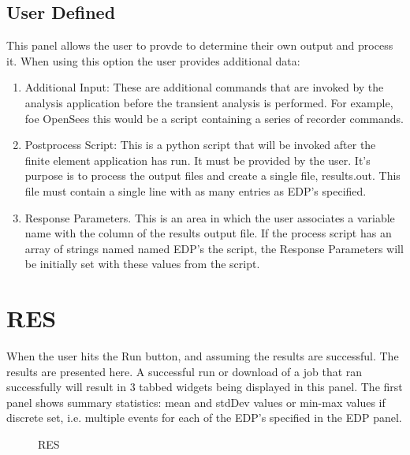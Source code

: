 \subsection{User Defined}
This panel allows the user to provde to determine their own output and process it. When using this option the user provides additional data:
\begin{enumerate}
\item Additional Input: These are additional commands that are invoked by the analysis application before the transient analysis is performed. For example, foe OpenSees this would be a script containing a series of recorder commands.
\item Postprocess Script: This is a python script that will be invoked after the finite element application has run. It must be provided by the user. It's purpose is to process the output files and create a single file, results.out. This file must contain a single line with as many entries as EDP's specified.

\item Response Parameters. This is an area in which the user associates a variable name with the column of the results output file. If the process script has an array of strings named named EDP's the script, the Response Parameters will be initially set with these values from the script.
\end{enumerate}


\section{RES}

When the user hits the Run button, and assuming the results are successful. The results are presented here.  A successful run or download of a job that ran successfully will result in 3 tabbed widgets being displayed in this panel.  The first panel shows summary statistics: mean and stdDev values or min-max values if discrete set, i.e. multiple events for each of the EDP's specified in the EDP panel.

\begin{figure}[!htbp]
  \caption{RES}
  \label{fig:figure12}
\end{figure}

